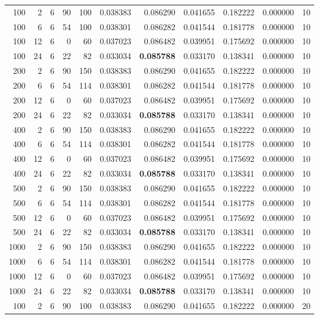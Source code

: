 \begin{table}
\begin{tabular}{rrrrrrrrrrr}
100 & 2 & 6 & 90 & 100 & 0.038383 & 0.086290 & 0.041655 & 0.182222 & 0.000000 & 10 \\
100 & 6 & 6 & 54 & 100 & 0.038301 & 0.086282 & 0.041544 & 0.181778 & 0.000000 & 10 \\
100 & 12 & 6 & 0 & 60 & 0.037023 & 0.086482 & 0.039951 & 0.175692 & 0.000000 & 10 \\
100 & 24 & 6 & 22 & 82 & 0.033034 & \textbf{0.085788} & 0.033170 & 0.138341 & 0.000000 & 10 \\
200 & 2 & 6 & 90 & 150 & 0.038383 & 0.086290 & 0.041655 & 0.182222 & 0.000000 & 10 \\
200 & 6 & 6 & 54 & 114 & 0.038301 & 0.086282 & 0.041544 & 0.181778 & 0.000000 & 10 \\
200 & 12 & 6 & 0 & 60 & 0.037023 & 0.086482 & 0.039951 & 0.175692 & 0.000000 & 10 \\
200 & 24 & 6 & 22 & 82 & 0.033034 & \textbf{0.085788} & 0.033170 & 0.138341 & 0.000000 & 10 \\
400 & 2 & 6 & 90 & 150 & 0.038383 & 0.086290 & 0.041655 & 0.182222 & 0.000000 & 10 \\
400 & 6 & 6 & 54 & 114 & 0.038301 & 0.086282 & 0.041544 & 0.181778 & 0.000000 & 10 \\
400 & 12 & 6 & 0 & 60 & 0.037023 & 0.086482 & 0.039951 & 0.175692 & 0.000000 & 10 \\
400 & 24 & 6 & 22 & 82 & 0.033034 & \textbf{0.085788} & 0.033170 & 0.138341 & 0.000000 & 10 \\
500 & 2 & 6 & 90 & 150 & 0.038383 & 0.086290 & 0.041655 & 0.182222 & 0.000000 & 10 \\
500 & 6 & 6 & 54 & 114 & 0.038301 & 0.086282 & 0.041544 & 0.181778 & 0.000000 & 10 \\
500 & 12 & 6 & 0 & 60 & 0.037023 & 0.086482 & 0.039951 & 0.175692 & 0.000000 & 10 \\
500 & 24 & 6 & 22 & 82 & 0.033034 & \textbf{0.085788} & 0.033170 & 0.138341 & 0.000000 & 10 \\
1000 & 2 & 6 & 90 & 150 & 0.038383 & 0.086290 & 0.041655 & 0.182222 & 0.000000 & 10 \\
1000 & 6 & 6 & 54 & 114 & 0.038301 & 0.086282 & 0.041544 & 0.181778 & 0.000000 & 10 \\
1000 & 12 & 6 & 0 & 60 & 0.037023 & 0.086482 & 0.039951 & 0.175692 & 0.000000 & 10 \\
1000 & 24 & 6 & 22 & 82 & 0.033034 & \textbf{0.085788} & 0.033170 & 0.138341 & 0.000000 & 10 \\
100 & 2 & 6 & 90 & 100 & 0.038383 & 0.086290 & 0.041655 & 0.182222 & 0.000000 & 20 \\

\end{tabular}
\end{table}

